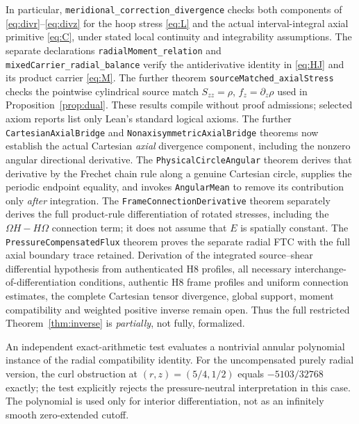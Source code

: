 \documentclass[11pt,a4paper]{article}
\theoremstyle{plain}
\theoremstyle{definition}
\begin{document}
In particular, \texttt{meridional\_correction\_divergence} checks both
components of \eqref{eq:divr}--\eqref{eq:divz} for the hoop stress
\eqref{eq:L} and the actual interval-integral axial primitive
\eqref{eq:C}, under stated local continuity and integrability
assumptions. The separate declarations
\texttt{radialMoment\_relation} and
\texttt{mixedCarrier\_radial\_balance} verify the antiderivative
identity in \eqref{eq:HJ} and its product carrier \eqref{eq:M}.
The further theorem \texttt{sourceMatched\_axialStress} checks the
pointwise cylindrical source match $S_{zz}=\rho$,
$f_z=\partial_z\rho$ used in Proposition~\ref{prop:dual}.
These results compile without proof admissions; selected axiom
reports list only Lean's standard logical axioms. The further
\texttt{CartesianAxialBridge} and
\texttt{NonaxisymmetricAxialBridge} theorems now establish the actual
Cartesian \emph{axial} divergence component, including the nonzero
angular directional derivative. The \texttt{PhysicalCircleAngular}
theorem derives that derivative by the Frechet chain rule along a
genuine Cartesian circle, supplies the periodic endpoint equality,
and invokes \texttt{AngularMean} to remove its contribution only
\emph{after} integration. The \texttt{FrameConnectionDerivative}
theorem separately derives the full product-rule differentiation of
rotated stresses, including the $\Omega H-H\Omega$ connection term;
it does not assume that $E$ is spatially constant. The
\texttt{PressureCompensatedFlux} theorem
proves the separate radial FTC with the full axial boundary trace
retained. Derivation of the integrated source--shear differential
hypothesis from authenticated H8 profiles, all necessary
interchange-of-differentiation conditions, authentic H8 frame
profiles and uniform connection estimates, the complete Cartesian
tensor divergence, global support,
moment compatibility and weighted positive inverse remain open.
Thus the full restricted Theorem~\ref{thm:inverse} is
\emph{partially}, not fully, formalized.

An independent exact-arithmetic test evaluates a nontrivial annular
polynomial instance of the radial compatibility identity. For the
uncompensated purely radial version, the curl obstruction at
$(r,z)=(5/4,1/2)$ equals $-5103/32768$ exactly; the test explicitly
rejects the pressure-neutral interpretation in this case. The
polynomial is used only for interior differentiation, not as an
infinitely smooth zero-extended cutoff.
\end{document}
